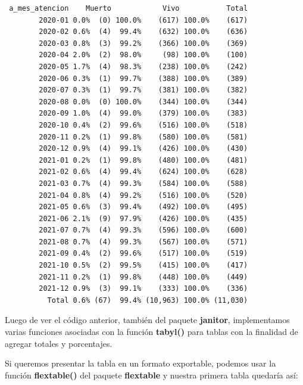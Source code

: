 \documentclass[
  letterpaper,
  DIV=11,
  numbers=noendperiod]{scrreprt}
\begin{document}
\begin{verbatim}
 a_mes_atencion    Muerto            Vivo           Total
        2020-01 0.0%  (0) 100.0%    (617) 100.0%    (617)
        2020-02 0.6%  (4)  99.4%    (632) 100.0%    (636)
        2020-03 0.8%  (3)  99.2%    (366) 100.0%    (369)
        2020-04 2.0%  (2)  98.0%     (98) 100.0%    (100)
        2020-05 1.7%  (4)  98.3%    (238) 100.0%    (242)
        2020-06 0.3%  (1)  99.7%    (388) 100.0%    (389)
        2020-07 0.3%  (1)  99.7%    (381) 100.0%    (382)
        2020-08 0.0%  (0) 100.0%    (344) 100.0%    (344)
        2020-09 1.0%  (4)  99.0%    (379) 100.0%    (383)
        2020-10 0.4%  (2)  99.6%    (516) 100.0%    (518)
        2020-11 0.2%  (1)  99.8%    (580) 100.0%    (581)
        2020-12 0.9%  (4)  99.1%    (426) 100.0%    (430)
        2021-01 0.2%  (1)  99.8%    (480) 100.0%    (481)
        2021-02 0.6%  (4)  99.4%    (624) 100.0%    (628)
        2021-03 0.7%  (4)  99.3%    (584) 100.0%    (588)
        2021-04 0.8%  (4)  99.2%    (516) 100.0%    (520)
        2021-05 0.6%  (3)  99.4%    (492) 100.0%    (495)
        2021-06 2.1%  (9)  97.9%    (426) 100.0%    (435)
        2021-07 0.7%  (4)  99.3%    (596) 100.0%    (600)
        2021-08 0.7%  (4)  99.3%    (567) 100.0%    (571)
        2021-09 0.4%  (2)  99.6%    (517) 100.0%    (519)
        2021-10 0.5%  (2)  99.5%    (415) 100.0%    (417)
        2021-11 0.2%  (1)  99.8%    (448) 100.0%    (449)
        2021-12 0.9%  (3)  99.1%    (333) 100.0%    (336)
          Total 0.6% (67)  99.4% (10,963) 100.0% (11,030)
\end{verbatim}

Luego de ver el código anterior, también del paquete \textbf{janitor},
implementamos varias funciones asociadas con la función \textbf{tabyl()}
para tablas con la finalidad de agregar totales y porcentajes.

Si queremos presentar la tabla en un formato exportable, podemos usar la
función \textbf{flextable()} del paquete \textbf{flextable} y nuestra
primera tabla quedaría así:
\end{document}
